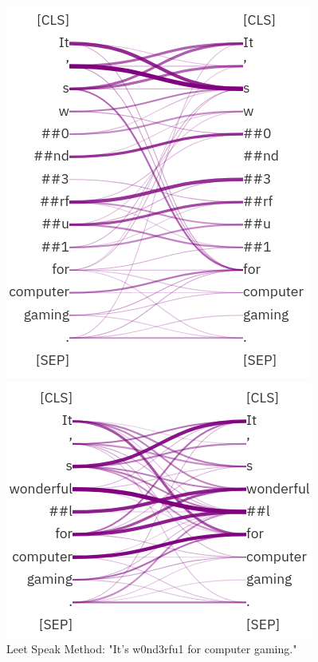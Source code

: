 \begin{figure}[!htb]
  \includegraphics[width=\linewidth]{img/attention_leet.png}
  \caption[BERTbase attention heads - Leet Speak]{Leet Speak Method: "It's w0nd3rfu1 for computer gaming."}\label{fig:attention_leet}
\endminipage\hfill
{}
  \includegraphics[width=\linewidth]{img/attention_typo.png}

\end{figure}
